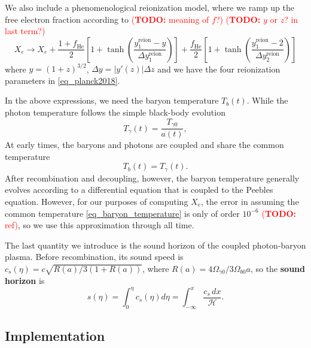 \documentclass[10pt,a4paper]{article}
\newcommand\TODO[1]{\textcolor{red}{(\textbf{TODO:} #1)}}
\begin{document}
We also include a phenomenological reionization model,
where we ramp up the free electron fraction according to
\TODO{meaning of $f$?}
\TODO{$y$ or $z$? in last term?}
\begin{equation}
	X_e \rightarrow X_e + \frac{1+f_\text{He}}{2} \left[ 1 + \tanh \left( \frac{y^\text{reion}_1-y}{\Delta y^\text{reion}_1} \right) \right]
                        + \frac{f_\text{He}}{2} \left[ 1 + \tanh \left( \frac{y^\text{reion}_1-2}{\Delta y^\text{reion}_2} \right) \right]
\label{eq_reionization}
\end{equation}
where $y = (1+z)^{3/2}$, $\Delta y = |y'(z)| \Delta z$ and we have the four reionization parameters in \ref{eq_planck2018}.

In the above expressions, we need the baryon temperature $T_b(t)$.
While the photon temperature follows the simple black-body evolution
\begin{equation}
	T_\gamma(t) = \frac{T_{\gamma 0}}{a(t)},
\label{eq_photon_temperature}
\end{equation}
At early times, the baryons and photons are coupled and share the common temperature
\begin{equation}
	T_b(t) = T_{\gamma}(t).
\label{eq_baryon_temperature}
\end{equation}
After recombination and decoupling, however,
the baryon temperature generally evolves according to a differential equation that is coupled to the Peebles equation.
However, for our purposes of computing $X_e$,
the error in assuming the common temperature \eqref{eq_baryon_temperature} is only of order $10^{-6}$ \TODO{ref},
so we use this approximation through all time.

The last quantity we introduce is the sound horizon
of the coupled photon-baryon plasma.
Before recombination, its sound speed is
$c_s(\eta) = c \sqrt{R(a) / 3(1+R(a))}$,
where $R(a) = 4 \Omega_{\gamma 0} / 3 \Omega_{b 0} a$,
so the \textbf{sound horizon} is
\begin{equation}
	s(\eta) = \int_0^\eta c_s(\eta) d\eta = \int_{-\infty}^x \frac{c_s \, dx}{\mathcal{H}}.
\label{eq_sound_horizon}
\end{equation}

\subsection{Implementation}
\end{document}
